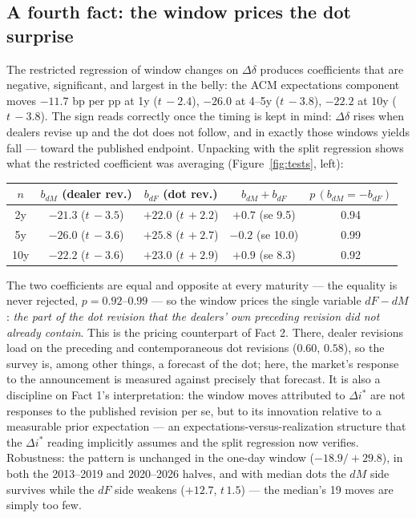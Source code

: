 \documentclass[11pt]{article}
\begin{document}
\subsection{A fourth fact: the window prices the dot surprise}
\label{sec:test-fact4}
The restricted regression of window changes on $\Delta\delta$ produces
coefficients that are negative, significant, and largest in the belly: the
ACM expectations component moves $-11.7$ bp per pp at 1y ($t\,{-}2.4$),
$-26.0$ at 4--5y ($t\,{-}3.8$), $-22.2$ at 10y ($t\,{-}3.8$). The sign reads
correctly once the timing is kept in mind: $\Delta\delta$ rises when dealers
revise up and the dot does not follow, and in exactly those windows yields
fall --- toward the published endpoint. Unpacking with the split regression
shows what the restricted coefficient was averaging
(Figure~\ref{fig:tests}, left):
\begin{center}\small
\begin{tabular}{ccccc}
\toprule
$n$ & $b_{dM}$ (dealer rev.) & $b_{dF}$ (dot rev.) & $b_{dM}+b_{dF}$ & $p\,(b_{dM}=-b_{dF})$\\
\midrule
2y & $-21.3$ ($t\,{-}3.5$) & $+22.0$ ($t\,{+}2.2$) & $+0.7$ (se 9.5) & 0.94\\
5y & $-26.0$ ($t\,{-}3.6$) & $+25.8$ ($t\,{+}2.7$) & $-0.2$ (se 10.0) & 0.99\\
10y & $-22.2$ ($t\,{-}3.6$) & $+23.0$ ($t\,{+}2.9$) & $+0.9$ (se 8.3) & 0.92\\
\bottomrule
\end{tabular}
\end{center}
\noindent The two coefficients are equal and opposite at every maturity ---
the equality is never rejected, $p=0.92$--$0.99$ --- so the window prices the
single variable $dF - dM$: \emph{the part of the dot revision that the
dealers' own preceding revision did not already contain}. This is the pricing
counterpart of Fact 2. There, dealer revisions load on the preceding and
contemporaneous dot revisions ($0.60$, $0.58$), so the survey is, among other
things, a forecast of the dot; here, the market's response to the announcement
is measured against precisely that forecast. It is also a discipline on
Fact 1's interpretation: the window moves attributed to $\Delta i^{*}$ are not
responses to the published revision per se, but to its innovation relative to
a measurable prior expectation --- an expectations-versus-realization
structure that the $\Delta i^{*}$ reading implicitly assumes and the split
regression now verifies. Robustness: the pattern is unchanged in the one-day
window ($-18.9/+29.8$), in both the 2013--2019 and 2020--2026 halves, and
with median dots the $dM$ side survives while the $dF$ side weakens
($+12.7$, $t\,1.5$) --- the median's 19 moves are simply too few.
\end{document}
